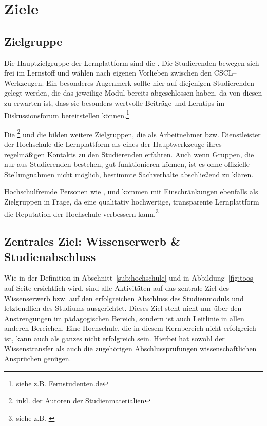 
\newpage
\section{Ziele} %
\label{sec:ziele}

\subsection{Zielgruppe} %
\label{sub:zielgruppe}
Die Hauptzielgruppe der Lernplattform sind die . Die Studierenden bewegen sich frei im Lernstoff und wählen nach eigenen Vorlieben zwischen den CSCL–Werkzeugen. Ein besonderes Augenmerk sollte hier auf diejenigen Studierenden gelegt werden, die das jeweilige Modul bereits abgeschlossen haben, da von diesen zu erwarten ist, dass sie besonders wertvolle Beiträge und Lerntips im Diskussionsforum bereitstellen können.\footnote{siehe z.B. \url{Fernstudenten.de}}

Die \footnote{inkl. der Autoren der Studienmaterialien} und die  bilden weitere Zielgruppen, die als Arbeitnehmer bzw. Dienstleister der Hochschule die Lernplattform als eines der Hauptwerkzeuge ihres regelmäßigen Kontakts zu den Studierenden erfahren. Auch wenn Gruppen, die nur aus Studierenden bestehen, gut funktionieren können, ist es ohne offizielle Stellungnahmen nicht möglich, bestimmte Sachverhalte abschließend zu klären.

Hochschulfremde Personen wie ,  und  kommen mit Einschränkungen ebenfalls als Zielgruppen in Frage, da eine qualitativ hochwertige, transparente Lernplattform die Reputation der Hochschule verbessern kann.\footnote{siehe z.B. \cite{cs50}} 

\subsection{Zentrales Ziel: Wissenserwerb \& Studienabschluss} %
\label{sub:zentrales_ziel_wissenserwerb_studienabschluss}
Wie in der Definition in Abschnitt~\ref{sub:hochschule} und in Abbildung~\ref{fig:toos} auf Seite \pageref{fig:toos} ersichtlich wird, sind alle Aktivitäten auf das zentrale Ziel des Wissenserwerb bzw. auf den erfolgreichen Abschluss des Studienmoduls und letztendlich des Studiums ausgerichtet. Dieses Ziel steht nicht nur über den Anstrengungen im pädagogischen Bereich, sondern ist auch Leitlinie in allen anderen Bereichen. Eine Hochschule, die in diesem Kernbereich nicht erfolgreich ist, kann auch als ganzes nicht erfolgreich sein. Hierbei hat sowohl der Wissenstransfer als auch die zugehörigen Abschlussprüfungen wissenschaftlichen Ansprüchen genügen.


